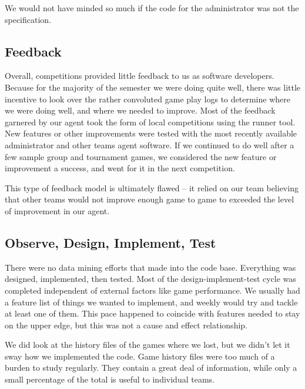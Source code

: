 \documentclass[letterpaper,12pt,oneside]{article}
\begin{document}
We would not have minded so much if the code for the administrator was not
the specification.

\subsection{Feedback}
Overall, competitions provided little feedback to us as software developers.
Because for the majority of the semester we were doing quite well, there was
little incentive to look over the rather convoluted game play logs to
determine where we were doing well, and where we needed to improve. Most of the
feedback garnered by our agent took the form of local competitions using the
runner tool. New features or other improvements were tested with the most
recently available administrator and other teams agent software. If we
continued to do well after a few sample group and tournament games, we
considered the new feature or improvement a success, and went for it in the
next competition.

This type of feedback model is ultimately flawed -- it relied on our team
believing that other teams would not improve enough game to game to exceeded
the level of improvement in our agent. 

\subsection{Observe, Design, Implement, Test}
There were no data mining efforts that made into the code base. Everything
was designed, implemented, then tested. Most of the design-implement-test cycle
was completed independent of external factors like game performance. We usually
had a feature list of things we wanted to implement, and weekly would try and
tackle at least one of them. This pace happened to coincide with features
needed to stay on the upper edge, but this was not a cause and effect
relationship.

We did look at the history files of the games where we lost, but we didn't
let it sway how we implemented the code. Game history files were too much of
a burden to study regularly. They contain a great deal of information, while
only a small percentage of the total is useful to individual teams.
\end{document}
